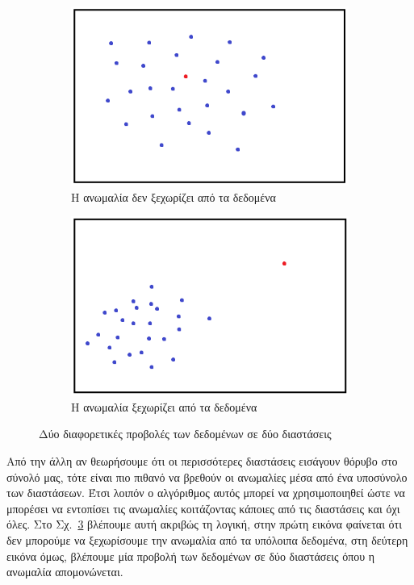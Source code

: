 \documentclass[a4paper,12pt]{report}
\theoremstyle{definitionNODot}
\begin{document}
	\begin{figure}[h]
		\begin{subfigure}[b]{0.49\textwidth}
			\centering
			\includegraphics[width=\textwidth]{featurebaggingA.png}
			\caption{Η ανωμαλία δεν ξεχωρίζει από τα δεδομένα}
			\label{fig:featurebaggingA}
		\end{subfigure}
		\hfill
		\begin{subfigure}[b]{0.49\textwidth}
			\centering
			\includegraphics[width=\textwidth]{featurebaggingB.png}
			\caption{Η ανωμαλία ξεχωρίζει από τα δεδομένα}
			\label{fig:featurebaggingB}
		\end{subfigure}
		\caption{Δύο διαφορετικές προβολές των δεδομένων σε δύο διαστάσεις}
		\label{fig:featurebaggingAB}
	\end{figure}
	
	Από την άλλη αν θεωρήσουμε ότι οι περισσότερες διαστάσεις εισάγουν θόρυβο στο σύνολό μας, τότε είναι πιο πιθανό να βρεθούν οι ανωμαλίες μέσα από ένα υποσύνολο των διαστάσεων. Έτσι λοιπόν ο αλγόριθμος αυτός μπορεί να χρησιμοποιηθεί ώστε να μπορέσει να εντοπίσει τις ανωμαλίες κοιτάζοντας κάποιες από τις διαστάσεις και όχι όλες. Στο Σχ.~\ref{fig:featurebaggingAB} βλέπουμε αυτή ακριβώς τη λογική, στην πρώτη εικόνα φαίνεται ότι δεν μπορούμε να ξεχωρίσουμε την ανωμαλία από τα υπόλοιπα δεδομένα, στη δεύτερη εικόνα όμως, βλέπουμε μία προβολή των δεδομένων σε δύο διαστάσεις όπου η ανωμαλία απομονώνεται.
	
\end{document}
